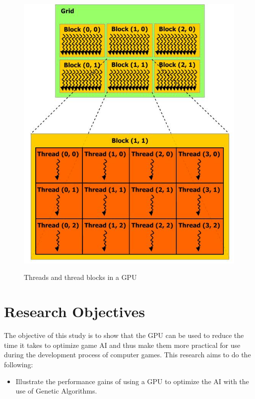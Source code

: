 \begin{figure}
	\centering
		\graphicspath{{images/}}
		\includegraphics[width=450 pt]{gpu.jpg}
	\caption{Threads and thread blocks in a GPU}
	\cite{pdf:NVCudaPrgGuide}
	\label{fig:gpu_diagram}
\end{figure}

\section{Research Objectives}

The objective of this study is to show that the GPU can be used to reduce the time
it takes to optimize game AI and thus make them more practical for use during the
development process of computer games. This research aims to do the following:

\begin{itemize}
 \item Illustrate the performance gains of using a GPU to optimize the AI with the
use of Genetic Algorithms.
\end{itemize}


